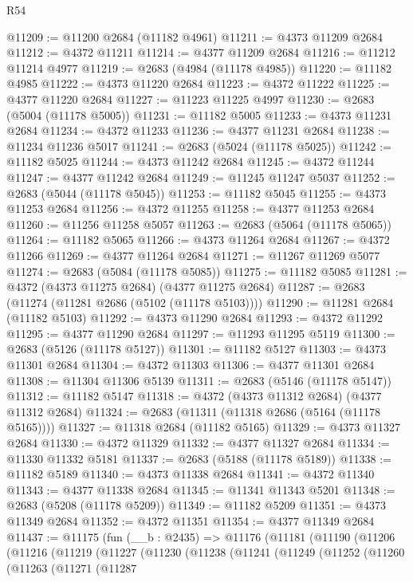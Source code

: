 \begin{lexlean}{R54}
\begin{coremodule}
@11209 := @11200 @2684 (@11182 @4961)
@11211 := @4373 @11209 @2684
@11212 := @4372 @11211
@11214 := @4377 @11209 @2684
@11216 := @11212 @11214 @4977
@11219 := @2683 (@4984 (@11178 @4985))
@11220 := @11182 @4985
@11222 := @4373 @11220 @2684
@11223 := @4372 @11222
@11225 := @4377 @11220 @2684
@11227 := @11223 @11225 @4997
@11230 := @2683 (@5004 (@11178 @5005))
@11231 := @11182 @5005
@11233 := @4373 @11231 @2684
@11234 := @4372 @11233
@11236 := @4377 @11231 @2684
@11238 := @11234 @11236 @5017
@11241 := @2683 (@5024 (@11178 @5025))
@11242 := @11182 @5025
@11244 := @4373 @11242 @2684
@11245 := @4372 @11244
@11247 := @4377 @11242 @2684
@11249 := @11245 @11247 @5037
@11252 := @2683 (@5044 (@11178 @5045))
@11253 := @11182 @5045
@11255 := @4373 @11253 @2684
@11256 := @4372 @11255
@11258 := @4377 @11253 @2684
@11260 := @11256 @11258 @5057
@11263 := @2683 (@5064 (@11178 @5065))
@11264 := @11182 @5065
@11266 := @4373 @11264 @2684
@11267 := @4372 @11266
@11269 := @4377 @11264 @2684
@11271 := @11267 @11269 @5077
@11274 := @2683 (@5084 (@11178 @5085))
@11275 := @11182 @5085
@11281 := @4372 (@4373 @11275 @2684) (@4377 @11275 @2684)
@11287 := @2683 (@11274 (@11281 @2686 (@5102 (@11178 @5103))))
@11290 := @11281 @2684 (@11182 @5103)
@11292 := @4373 @11290 @2684
@11293 := @4372 @11292
@11295 := @4377 @11290 @2684
@11297 := @11293 @11295 @5119
@11300 := @2683 (@5126 (@11178 @5127))
@11301 := @11182 @5127
@11303 := @4373 @11301 @2684
@11304 := @4372 @11303
@11306 := @4377 @11301 @2684
@11308 := @11304 @11306 @5139
@11311 := @2683 (@5146 (@11178 @5147))
@11312 := @11182 @5147
@11318 := @4372 (@4373 @11312 @2684) (@4377 @11312 @2684)
@11324 := @2683 (@11311 (@11318 @2686 (@5164 (@11178 @5165))))
@11327 := @11318 @2684 (@11182 @5165)
@11329 := @4373 @11327 @2684
@11330 := @4372 @11329
@11332 := @4377 @11327 @2684
@11334 := @11330 @11332 @5181
@11337 := @2683 (@5188 (@11178 @5189))
@11338 := @11182 @5189
@11340 := @4373 @11338 @2684
@11341 := @4372 @11340
@11343 := @4377 @11338 @2684
@11345 := @11341 @11343 @5201
@11348 := @2683 (@5208 (@11178 @5209))
@11349 := @11182 @5209
@11351 := @4373 @11349 @2684
@11352 := @4372 @11351
@11354 := @4377 @11349 @2684
@11437 := @11175
    (fun (__b : @2435) =>
    @11176
      (@11181
        (@11190
          (@11206
            (@11216
              (@11219
                (@11227
                  (@11230
                    (@11238
                      (@11241
                        (@11249
                          (@11252
                            (@11260
                              (@11263
                                (@11271
                                  (@11287

\end{coremodule}
\end{lexlean}
